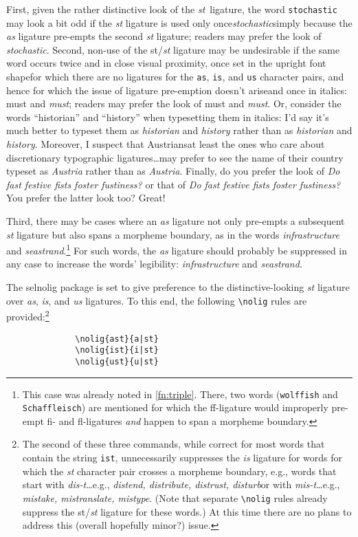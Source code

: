 \documentclass[11pt]{article}
\newcommand{\pkg}[1]{\textsf{#1}}
\newcommand{\opt}[1]{\texttt{#1}}
\newcommand{\cmmd}[1]{\texttt{\textbackslash #1}}
\begin{document}
First, given the rather distinctive look of the \emph{st}~ligature, the word \opt{stochastic} may look a bit odd if the \emph{st} ligature is used only once\textemdash\emph{stoch\mbox{as}tic}\textemdash simply because the \emph{as} ligature pre-empts the second \emph{st} ligature; readers may prefer the look of \emph{stocha\mbox{st}ic}. Second, non-use of the st/\emph{st} ligature may be undesirable if the same word occurs twice and in close visual proximity, once set in the upright font shape\textemdash for which there are no ligatures for the \opt{as}, \opt{is}, and \opt{us} character pairs, and hence for which the issue of ligature pre-emption doesn't arise\textemdash and once in italics: must and \emph{m\mbox{us}t}; readers may prefer the look of must and \emph{mu\mbox{st}}. Or, consider the words \enquote{historian} and \enquote{history} when typesetting them in italics: I'd say it's much better to typeset them as \emph{historian} and \emph{history} rather than as \emph{h\mbox{is}torian} and \emph{h\mbox{is}tory}. Moreover, I suspect that Austrians\textemdash at least the ones who care about discretionary typographic ligatures\dots\textemdash may prefer to see the name of their country typeset as \emph{Austria} rather than as \emph{A\mbox{us}tria}. Finally, do you prefer the look of \emph{Do f\mbox{as}t festive f\mbox{is}ts foster f\mbox{us}tiness?} or that of \emph{Do fast festive fists foster fustiness?} You prefer the latter look too? Great! 

Third, there may be cases where an \emph{as} ligature not only pre-empts a subsequent \emph{st} ligature but also spans a morpheme boundary, as in the words \emph{infr\mbox{as}tructure} and \emph{se\mbox{as}trand}.\footnote{This case was already noted in \cref{fn:triple}. There, two words (\opt{wolffish} and \opt{Schaffleisch}) are mentioned for which the ff-ligature would improperly pre-empt fi- and fl-ligatures \emph{and} happen to span a morpheme boundary.} For such words, the \emph{as} ligature should probably be suppressed in any case to increase the words' legibility: \emph{infra\mbox{st}ructure} and \emph{sea\mbox{st}rand}.

The \pkg{selnolig} package is set to give preference to the distinctive-looking \emph{st} ligature over \emph{as}, \emph{is}, and \emph{us} ligatures. To this end, the following \cmmd{nolig} rules are provided:\footnote{The second of these three commands, while correct for most words that contain the string \opt{ist}, unnecessarily suppresses the \emph{is} ligature for words for which the \emph{st} character pair crosses a morpheme boundary, e.g., words that start with \emph{dis-t\ldots}\textemdash e.g., \emph{distend, distribute, distrust, disturb}\textemdash or with \emph{mis-t\ldots}\textemdash e.g., \emph{mistake, mistranslate, mistype}. (Note that separate \cmmd{nolig} rules already suppress the st/\emph{st} ligature for these words.) At this time there are no plans to address this (overall hopefully minor?) issue.}
\begin{Verbatim}
              \nolig{ast}{a|st}
              \nolig{ist}{i|st}
              \nolig{ust}{u|st}
\end{Verbatim}
\end{document}
